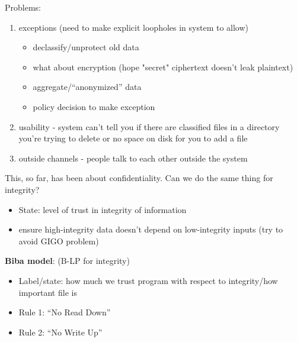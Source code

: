 Problems:
\begin{enumerate}
    \item exceptions (need to make explicit loopholes in system to allow)
    \begin{itemize}
        \item declassify/unprotect old data
        \item what about encryption (hope "secret" ciphertext doesn't leak plaintext)
        \item aggregate/``anonymized'' data
        \item policy decision to make exception
    \end{itemize}
    \item usability - system can't tell you if there are classified files in a
        directory you're trying to delete or no space on disk for you to add a
        file
    \item outside channels - people talk to each other outside the system
\end{enumerate}

This, so far, has been about confidentiality. Can we do the same thing for
integrity?
\begin{itemize}
    \item State: level of trust in integrity of information
    \item ensure high-integrity data doesn't depend on low-integrity inputs
        (try to avoid GIGO problem)
\end{itemize}

{\bf Biba model}: (B-LP for integrity)
\begin{itemize}
    \item Label/state: how much we trust program with respect to integrity/how important file is
    \item Rule 1: ``No Read Down''
    \item Rule 2: ``No Write Up''
\end{itemize}

